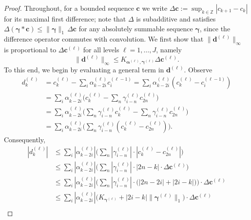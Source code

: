 \documentclass[10pt,a4paper]{amsart}
\begin{document}
\begin{proof}
    Throughout, for a bounded sequence $\boldsymbol{c}$ we write $\Delta\boldsymbol{c}\mathrel{:=}\sup_{k\in\mathbb{Z}}|c_{k+1}-c_k|$ for its maximal first difference; note that $\Delta$ is subadditive and satisfies $\Delta(\boldsymbol{\gamma}*\boldsymbol{c})\leq\|\boldsymbol{\gamma}\|_1\,\Delta\boldsymbol{c}$ for any absolutely summable sequence $\boldsymbol{\gamma}$, since the difference operator commutes with convolution. We first show that $\|\boldsymbol{d}^{(\ell)}\|_\infty$ is proportional to $\Delta\boldsymbol{c}^{(\ell)}$ for all levels $\ell=1,\dots,J$, namely
    \begin{equation}\label{eqn:details_Delta}
        \|\boldsymbol{d}^{(\ell)}\|_\infty \leq K_{\boldsymbol{\alpha}^{(\ell)},\boldsymbol{\gamma}^{(\ell)}} \Delta \boldsymbol{c}^{(\ell)}.
    \end{equation}
    To this end, we begin by evaluating a general term in $\boldsymbol{d}^{(\ell)}$. Observe
    \begin{equation*}
    \begin{split}
        d^{(\ell)}_k & =c^{(\ell)}_k-\sum_i \alpha^{(\ell)}_{k-2i}c^{(\ell-1)}_i=\sum_i \alpha^{(\ell)}_{k-2i}(c^{(\ell)}_k-c^{(\ell-1)}_i)\\
        & =\sum_i \alpha^{(\ell)}_{k-2i}\bigg(c^{(\ell)}_k-\sum_n \gamma^{(\ell)}_{i-n} c^{(\ell)}_{2n}\bigg)\\
        & =\sum_i \alpha^{(\ell)}_{k-2i}\bigg(\sum_n \gamma^{(\ell)}_{i-n}c^{(\ell)}_k-\sum_n \gamma^{(\ell)}_{i-n} c^{(\ell)}_{2n}\bigg)\\
        & =\sum_i \alpha^{(\ell)}_{k-2i}\bigg(\sum_n \gamma^{(\ell)}_{i-n}(c^{(\ell)}_k-c^{(\ell)}_{2n})\bigg).
    \end{split}
    \end{equation*}
    Consequently,
    \begin{equation*}
    \begin{split}
        |d^{(\ell)}_k| & \leq \sum_i|\alpha^{(\ell)}_{k-2i}|\bigg(\sum_n |\gamma^{(\ell)}_{i-n}|\cdot |c^{(\ell)}_k-c^{(\ell)}_{2n}|\bigg)\\ & \leq \sum_i|\alpha^{(\ell)}_{k-2i}|\bigg(\sum_n |\gamma^{(\ell)}_{i-n}|\cdot |2n-k| \cdot \Delta\boldsymbol{c}^{(\ell)}\bigg)\\
        & \leq \sum_i|\alpha^{(\ell)}_{k-2i}|\bigg(\sum_n |\gamma^{(\ell)}_{i-n}|\cdot \big(|2n-2i|+|2i-k|\big) \bigg) \cdot \Delta\boldsymbol{c}^{(\ell)}\\
        & \leq \sum_i|\alpha^{(\ell)}_{k-2i}|\bigg(K_{\boldsymbol{\gamma}^{(\ell)}}+|2i-k| \|\boldsymbol{\gamma}^{(\ell)}\|_1\bigg) \cdot \Delta\boldsymbol{c}^{(\ell)}\\

\end{split}
\end{equation*}
\end{proof}
\end{document}
